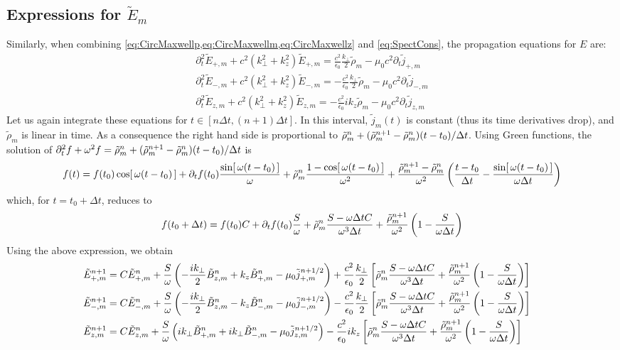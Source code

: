 \subsection{Expressions for $\tilde{E}_m$}

Similarly, when combining \cref{eq:CircMaxwellp,eq:CircMaxwellm,eq:CircMaxwellz}
and \cref{eq:SpectCons}, the propagation equations for $E$ are:
\begin{align*}
\partial_t^2 \tilde{E}_{+,m} + c^2(k_\perp^2 + k_z^2) \tilde{E}_{+,m}
= \frac{c^2}{\epsilon_0} \frac{k_\perp}{2} \tilde{\rho}_m -
\mu_0c^2 \partial_t\tilde{j}_{+,m} \\
\partial_t^2 \tilde{E}_{-,m} + c^2(k_\perp^2 + k_z^2) \tilde{E}_{-,m}
= - \frac{c^2}{\epsilon_0} \frac{k_\perp}{2} \tilde{\rho}_m -
\mu_0c^2 \partial_t\tilde{j}_{-,m} \\
\partial_t^2 \tilde{E}_{z,m} + c^2(k_\perp^2 + k_z^2) \tilde{E}_{z,m}
= - \frac{c^2}{\epsilon_0} i k_z \tilde{\rho}_m -
\mu_0c^2 \partial_t\tilde{j}_{z,m} 
\end{align*}
Let us again integrate these equations for $t\in [n\Delta t, (n+1)\Delta
t]$. In this interval, $\tilde{j}_m(t)$ is constant (thus its time
derivatives drop), and $\tilde{\rho}_m$ is linear in time. As a
consequence the right hand side is proportional to $\tilde{\rho}_{m}^{n} +
(\tilde{\rho}_{m}^{n+1}-\tilde{\rho}_{m}^{n})(t-t_0)/\Delta t$. Using Green functions, the solution of 
$ \partial_t^2 f + \omega^2 f = \tilde{\rho}_{m}^{n} + (\tilde{\rho}_{m}^{n+1}-\tilde{\rho}_{m}^{n})(t-t_0)/\Delta t $ is
\[ f(t) = f(t_0) \cos[\,\omega(t-t_0)\,] + \partial_tf (t_0)
\frac{\sin[\,\omega(t-t_0)\,]}{\omega} + \tilde{\rho}_{m}^{n}\frac{1-
  \cos[\,\omega(t-t_0)\,]}{\omega^2} + \frac{\tilde{\rho}_{m}^{n+1}-\tilde{\rho}_{m}^{n}}{\omega^2}\left(
  \frac{t-t_0}{\Delta t} - \frac{\sin[\,\omega(t-t_0)\,]}{\omega
    \Delta t}
\right) \]
which, for $t=t_0 +\Delta t$, reduces to
\[ f(t_0 +\Delta t) = f(t_0) C + \partial_tf (t_0)
\frac{S}{\omega} + \tilde{\rho}_{m}^{n}\frac{S-\omega\Delta t
  C}{\omega^3\Delta t} + \frac{\tilde{\rho}_{m}^{n+1}}{\omega^2}\left(
  1 - \frac{S}{\omega\Delta t}\right) \]
Using the above expression, we obtain
\begin{align*}
\tilde{E}_{+,m}^{n+1} = \; & C \tilde{E}_{+,m}^{n} + 
\frac{S}{\omega}\left(-\frac{ik_\perp }{2} \tilde{B}_{z,m}^{n} + k_z\tilde{B}_{+,m}^{n}
- \mu_0 \tilde{j}_{+,m}^{n+1/2} \right) + \frac{c^2}{\epsilon_0}
\frac{k_\perp}{2}\left[ \tilde{\rho}_{m}^{n}\frac{S-\omega\Delta t
  C}{\omega^3\Delta t} + \frac{\tilde{\rho}_{m}^{n+1}}{\omega^2}\left(
  1 - \frac{S}{\omega\Delta t}\right) \right]  & \\
\tilde{E}_{-,m}^{n+1} =\; & C \tilde{E}_{-,m}^{n} +
\frac{S}{\omega}\left(- \frac{ik_\perp }{2} \tilde{B}_{z,m}^{n} - k_z\tilde{B}_{-,m}^{n}
- \mu_0 \tilde{j}_{-,m}^{n+1/2} \right) - \frac{c^2}{\epsilon_0}
\frac{k_\perp}{2}\left[ \tilde{\rho}_{m}^{n}\frac{S-\omega\Delta t
  C}{\omega^3\Delta t} + \frac{\tilde{\rho}_{m}^{n+1}}{\omega^2}\left(
  1 - \frac{S}{\omega\Delta t}\right) \right]  &\\
\tilde{E}_{z,m}^{n+1} =\; & C \tilde{E}_{z,m}^{n} + 
\frac{S}{\omega}\left(ik_\perp \tilde{B}_{+,m}^{n} + ik_\perp \tilde{B}_{-,m}^{n}
- \mu_0 \tilde{j}_{z,m}^{n+1/2} \right) - \frac{c^2}{\epsilon_0}
ik_z\left[ \tilde{\rho}_{m}^{n}\frac{S-\omega\Delta t
  C}{\omega^3\Delta t} + \frac{\tilde{\rho}_{m}^{n+1}}{\omega^2}\left(
  1 - \frac{S}{\omega\Delta t}\right) \right]  &
\end{align*}

